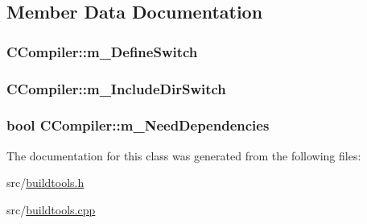 \subsection{Member Data Documentation}
\hypertarget{classCCompiler_aec5b354b2fa305ca95696cb2fb7d8e79}{
\subsubsection[{m\-\_\-\-Define\-Switch}]{ C\-Compiler\-::m\-\_\-\-Define\-Switch\hspace{0.3cm}{\ttfamily [protected]}}}\label{classCCompiler_aec5b354b2fa305ca95696cb2fb7d8e79}
\hypertarget{classCCompiler_a68e5d39931d7dcaabe9fe019a3838ed4}{
\subsubsection[{m\-\_\-\-Include\-Dir\-Switch}]{ C\-Compiler\-::m\-\_\-\-Include\-Dir\-Switch\hspace{0.3cm}{\ttfamily [protected]}}}\label{classCCompiler_a68e5d39931d7dcaabe9fe019a3838ed4}
\hypertarget{classCCompiler_a8fb628e8ffdab42f6d562229e4e9d2ed}{
\subsubsection[{m\-\_\-\-Need\-Dependencies}]{\setlength{\rightskip}{0pt plus 5cm}bool C\-Compiler\-::m\-\_\-\-Need\-Dependencies\hspace{0.3cm}{\ttfamily [protected]}}}\label{classCCompiler_a8fb628e8ffdab42f6d562229e4e9d2ed}


The documentation for this class was generated from the following files\-:\begin{DoxyCompactItemize}
\item 
src/\hyperlink{buildtools_8h}{buildtools.\-h}\item 
src/\hyperlink{buildtools_8cpp}{buildtools.\-cpp}\end{DoxyCompactItemize}
